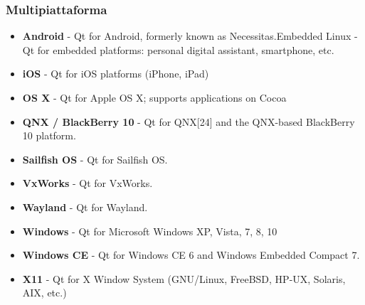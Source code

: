 \documentclass[10pt]{beamer}
\begin{document}
\begin{frame}
	\frametitle{Multipiattaforma}
	\begin{itemize}
		\item \textbf{Android} - Qt for Android, formerly known as Necessitas.Embedded Linux - Qt for embedded platforms: personal digital assistant, smartphone,
		etc.
		\item \textbf{iOS} - Qt for iOS platforms (iPhone, iPad)
		\item \textbf{OS X} - Qt for Apple OS X; supports applications on Cocoa
		\item \textbf{QNX / BlackBerry 10} - Qt for QNX[24] and the QNX-based BlackBerry 10 platform.
		\item \textbf{Sailfish OS} - Qt for Sailfish OS.
		\item \textbf{VxWorks} - Qt for VxWorks.
		\item \textbf{Wayland} - Qt for Wayland.
		\item \textbf{Windows} - Qt for Microsoft Windows XP, Vista, 7, 8, 10
		\item \textbf{Windows CE} - Qt for Windows CE 6 and Windows Embedded Compact 7.
		\item \textbf{X11} - Qt for X Window System (GNU/Linux, FreeBSD, HP-UX, Solaris, AIX, etc.)
	\end{itemize}
\end{frame}
\end{document}
